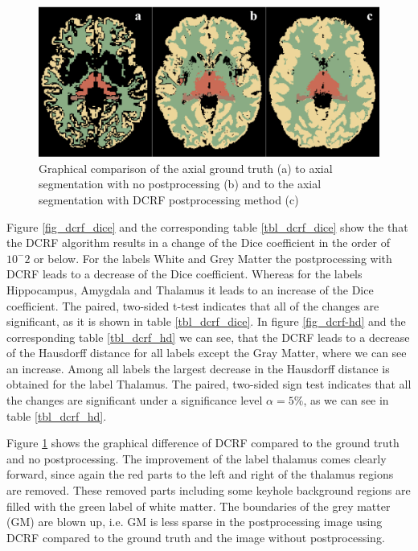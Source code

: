 \documentclass[journal]{IEEEtran}
\begin{document}
\begin{figure}[ht]
\centering

\includegraphics[width=\textwidth]{img/boxplots/DCRF.png}
\caption{Graphical comparison of the axial ground truth (a) to axial segmentation with no postprocessing (b) and to the axial segmentation with DCRF postprocessing method (c) }
\label{fig_dcrf}
\end{figure}

Figure \ref{fig_dcrf_dice} and the corresponding table \ref{tbl_dcrf_dice} show the that the DCRF algorithm results in a change of the Dice coefficient in the order of $10^-2$ or below. For the labels White and Grey Matter the postprocessing with DCRF leads to a decrease of the Dice coefficient. Whereas for the labels Hippocampus, Amygdala and Thalamus it leads to an increase of the Dice coefficient. The paired, two-sided t-test indicates that all of the changes are significant, as it is shown in table \ref{tbl_dcrf_dice}. In figure \ref{fig_dcrf-hd} and the corresponding table \ref{tbl_dcrf_hd} we can see, that the DCRF leads to a decrease of the Hausdorff distance for all labels except the Gray Matter, where we can see an increase. Among all labels the largest decrease in the Hausdorff distance is obtained for the label Thalamus. The paired, two-sided sign test indicates that all the changes are significant under a significance level $\alpha = 5\%$, as we can see in table \ref{tbl_dcrf_hd}.

Figure \ref{fig_dcrf} shows the graphical difference of DCRF compared to the ground truth and no postprocessing. The improvement of the label thalamus comes clearly forward, since again the red parts to the left and right of the thalamus regions are removed. These removed parts including some keyhole background regions are filled with the green label of white matter. 
The boundaries of the grey matter (GM) are blown up, i.e. GM is less sparse in the postprocessing image using DCRF compared to the ground truth and the image without postprocessing.
\end{document}

